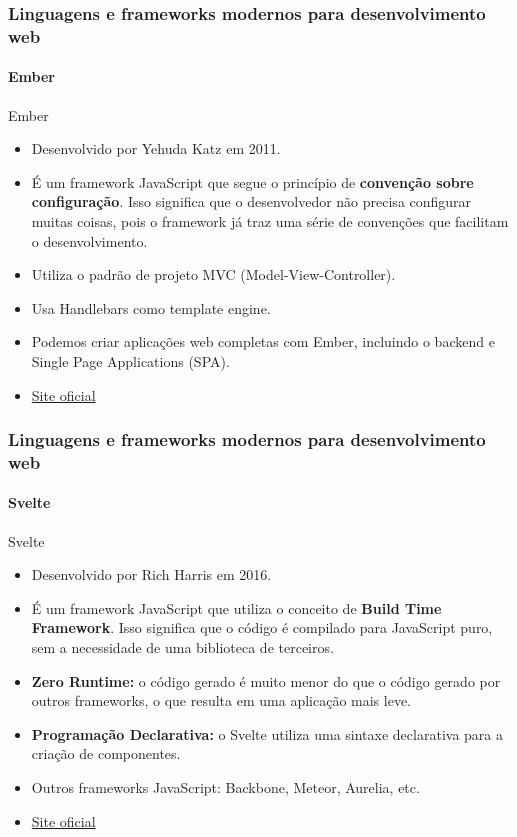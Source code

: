 \documentclass[
	9pt, %
	t, %
]{beamer}
\newcommand{\iconLink}[2]{\href{#1}{\faLink \hspace{0.2em} {#2}}}
\begin{document}
\begin{frame}
	\frametitle{Linguagens e frameworks modernos para desenvolvimento web}
	\framesubtitle{Ember}

	\begin{block}{Ember}
		\begin{itemize}
			\item Desenvolvido por Yehuda Katz em 2011.
			\item É um framework JavaScript que segue o princípio de \textbf{convenção sobre configuração}. Isso significa que o desenvolvedor não precisa configurar muitas coisas, pois o framework já traz uma série de convenções que facilitam o desenvolvimento.
			\item Utiliza o padrão de projeto MVC (Model-View-Controller).
			\item Usa Handlebars como template engine.
			\item Podemos criar aplicações web completas com Ember, incluindo o backend e Single Page Applications (SPA).
			\item \iconLink{https://emberjs.com/}{Site oficial}
		\end{itemize}

	\end{block}

\end{frame}

\begin{frame}
	\frametitle{Linguagens e frameworks modernos para desenvolvimento web}
	\framesubtitle{Svelte}

	\begin{block}{Svelte}
		\begin{itemize}
			\item Desenvolvido por Rich Harris em 2016.
			\item É um framework JavaScript que utiliza o conceito de \textbf{Build Time Framework}. Isso significa que o código é compilado para JavaScript puro, sem a necessidade de uma biblioteca de terceiros.
			\item \textbf{Zero Runtime:} o código gerado é muito menor do que o código gerado por outros frameworks, o que resulta em uma aplicação mais leve.
			\item \textbf{Programação Declarativa:} o Svelte utiliza uma sintaxe declarativa para a criação de componentes.
			\item Outros frameworks JavaScript: Backbone, Meteor, Aurelia, etc.
			\item \iconLink{https://svelte.dev/}{Site oficial}
		\end{itemize}

	\end{block}

\end{frame}
\end{document}
